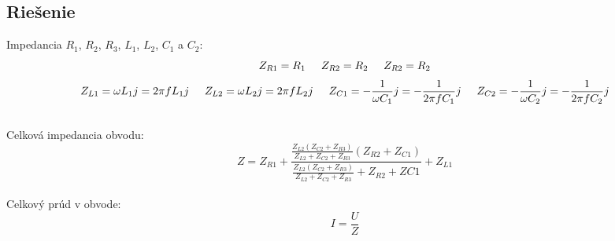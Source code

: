 \documentclass[10pt,a4paper]{article}
\begin{document}
\vspace{10mm}


\subsection{Riešenie}

Impedancia $R_1$, $R_2$, $R_3$, $L_1$, $L_2$, $C_1$ a $C_2$:
\\
\begin{equation*}
Z_{R1} = R_1
\hspace{0.5cm} Z_{R2} = R_2
\hspace{0.5cm} Z_{R2} = R_2
\end{equation*}
\begin{equation*}
Z_{L1} = \omega  L_1 j  = 2 \pi f L_1 j
\hspace{0.5cm} Z_{L2} = \omega  L_2 j = 2 \pi f  L_2 j 
\hspace{0.5cm} Z_{C1} = -\frac{1}{\omega C_1}j = -\frac{1}{2 \pi f C_1}j
\hspace{0.5cm} Z_{C2} = -\frac{1}{\omega C_2}j = -\frac{1}{2 \pi f C_2}j
\end{equation*}
\\
Celková impedancia obvodu:
\\
\begin{equation*}
Z = Z_{R1} + \frac{\frac{Z_{L2}(Z_{C2}+{Z_{R3}})}{Z_{L2}+Z_{C2}+Z_{R3}}(Z_{R2}+Z_{C1})}{\frac{Z_{L2}(Z_{C2}+Z_{R3})}{Z_{L2}+Z_{C2}+Z_{R3}}+Z_{R2}+Z{C1}} + Z_{L1}
\end{equation*}
\\
Celkový prúd v obvode:
\\
\begin{equation*}
I = \frac{U}{Z}
\end{equation*}
\end{document}
